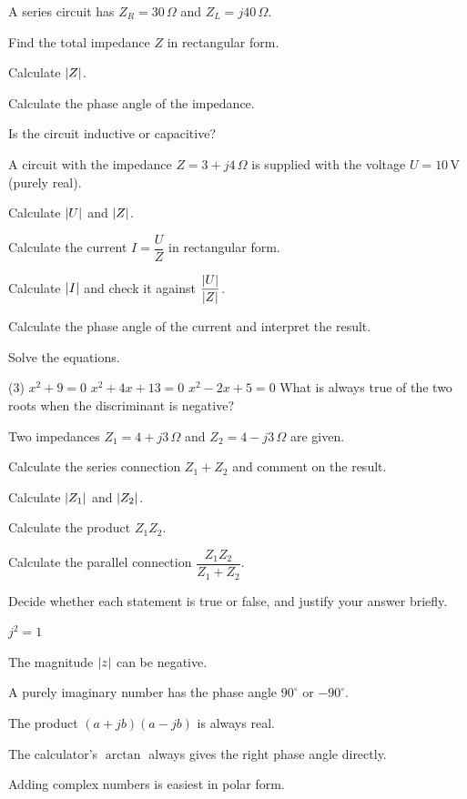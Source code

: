 A series circuit has $Z_R = 30\,\Omega$ and $Z_L = j40\,\Omega$.
\begin{parts}
  \item Find the total impedance $Z$ in rectangular form.
  \item Calculate $\lvert Z\rvert$.
  \item Calculate the phase angle of the impedance.
  \item Is the circuit inductive or capacitive?
\end{parts}

A circuit with the impedance $Z = 3 + j4\,\Omega$ is supplied with the voltage $U = 10\,\text{V}$
(purely real).
\begin{parts}
  \item Calculate $\lvert U\rvert$ and $\lvert Z\rvert$.
  \item Calculate the current $I = \dfrac{U}{Z}$ in rectangular form.
  \item Calculate $\lvert I\rvert$ and check it against $\dfrac{\lvert U\rvert}{\lvert Z\rvert}$.
  \item Calculate the phase angle of the current and interpret the result.
\end{parts}

Solve the equations.
\begin{delar}(3)
  \task $x^2 + 9 = 0$
  \task $x^2 + 4x + 13 = 0$
  \task $x^2 - 2x + 5 = 0$
  \task* What is always true of the two roots when the discriminant is negative?
\end{delar}

Two impedances $Z_1 = 4 + j3\,\Omega$ and $Z_2 = 4 - j3\,\Omega$ are given.
\begin{parts}
  \item Calculate the series connection $Z_1 + Z_2$ and comment on the result.
  \item Calculate $\lvert Z_1\rvert$ and $\lvert Z_2\rvert$.
  \item Calculate the product $Z_1Z_2$.
  \item Calculate the parallel connection $\dfrac{Z_1Z_2}{Z_1 + Z_2}$.
\end{parts}

Decide whether each statement is true or false, and justify your answer briefly.
\begin{parts}
  \item $j^2 = 1$
  \item The magnitude $\lvert z\rvert$ can be negative.
  \item A purely imaginary number has the phase angle $90^{\circ}$ or $-90^{\circ}$.
  \item The product $(a + jb)(a - jb)$ is always real.
  \item The calculator's $\arctan$ always gives the right phase angle directly.
  \item Adding complex numbers is easiest in polar form.
\end{parts}

